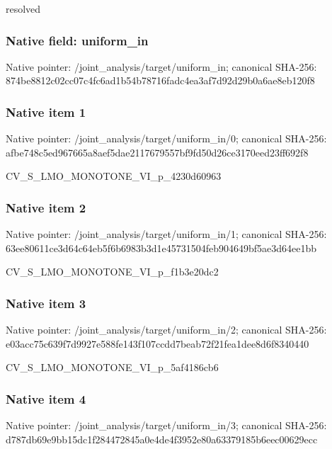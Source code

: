 \documentclass[10pt,a4paper]{article}
\begin{document}
\begingroup\raggedright\sloppy resolved\par\endgroup

\subsubsection{Native field: uniform\_\allowbreak{}in}
Native pointer: /joint\_\allowbreak{}analysis/target/uniform\_\allowbreak{}in; canonical SHA-256: 874be8812c02cc07c4fc6ad1b54b78716fadc4ea3af7d92d29b0a6ae8eb120f8

\subsubsection{Native item 1}
Native pointer: /joint\_\allowbreak{}analysis/target/uniform\_\allowbreak{}in/0; canonical SHA-256: afbe748c5ed967665a8aef5dae2117679557bf9fd50d26ce3170eed23ff692f8

\begingroup\raggedright\sloppy CV\_\allowbreak{}S\_\allowbreak{}LMO\_\allowbreak{}MONOTONE\_\allowbreak{}VI\_\allowbreak{}p\_\allowbreak{}4230d60963\par\endgroup

\subsubsection{Native item 2}
Native pointer: /joint\_\allowbreak{}analysis/target/uniform\_\allowbreak{}in/1; canonical SHA-256: 63ee80611ce3d64c64eb5f6b6983b3d1e45731504feb904649bf5ae3d64ee1bb

\begingroup\raggedright\sloppy CV\_\allowbreak{}S\_\allowbreak{}LMO\_\allowbreak{}MONOTONE\_\allowbreak{}VI\_\allowbreak{}p\_\allowbreak{}f1b3e20dc2\par\endgroup

\subsubsection{Native item 3}
Native pointer: /joint\_\allowbreak{}analysis/target/uniform\_\allowbreak{}in/2; canonical SHA-256: e03acc75c639f7d9927e588fe143f107ccdd7beab72f21fea1dee8d6f8340440

\begingroup\raggedright\sloppy CV\_\allowbreak{}S\_\allowbreak{}LMO\_\allowbreak{}MONOTONE\_\allowbreak{}VI\_\allowbreak{}p\_\allowbreak{}5af4186cb6\par\endgroup

\subsubsection{Native item 4}
Native pointer: /joint\_\allowbreak{}analysis/target/uniform\_\allowbreak{}in/3; canonical SHA-256: d787db69e9bb15dc1f284472845a0e4de4f3952e80a63379185b6eec00629ecc
\end{document}
